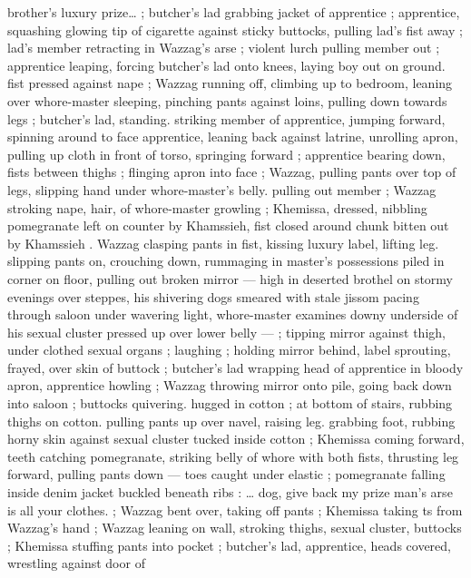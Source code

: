 brother's luxury prize{\ldots}{\gr} ; butcher's lad grabbing jacket of 
apprentice ; apprentice, squashing glowing tip of cigarette against 
sticky buttocks, pulling lad's fist away ; lad's member retracting in 
Wazzag's arse ; violent lurch pulling member out ; apprentice 
leaping, forcing butcher's lad onto knees, laying boy out on ground. 
fist pressed against nape ; Wazzag running off, climbing up to 
bedroom, leaning over whore-master sleeping, pinching pants 
against loins, pulling down towards legs ; butcher's lad, standing. 
striking member of apprentice, jumping forward, spinning around to 
face apprentice, leaning back against latrine, unrolling apron, pulling 
up cloth in front of torso, springing forward ; apprentice bearing 
down, fists between thighs ; flinging apron into face ; Wazzag, pulling 
pants over top of legs, slipping hand under whore-master's belly. 
pulling out member ; Wazzag stroking nape, hair, of whore-master 
growling ; Khemissa, dressed, nibbling pomegranate left on counter 
by Khamssieh, fist closed around chunk bitten out by Khamssieh . 
Wazzag clasping pants in fist, kissing luxury label, lifting leg. slipping 
pants on, crouching down, rummaging in master's possessions piled 
in corner on floor, pulling out broken mirror --- high in deserted 
brothel on stormy evenings over steppes, his shivering dogs 
smeared with stale jissom pacing through saloon under wavering 
light, whore-master examines downy underside of his sexual cluster 
pressed up over lower belly --- ; tipping mirror against thigh, under 
clothed sexual organs ; laughing ; holding mirror behind, label 
sprouting, frayed, over skin of buttock ; butcher's lad wrapping head 
of apprentice in bloody apron, apprentice howling ; Wazzag throwing 
mirror onto pile, going back down into saloon ; buttocks quivering. 
hugged in cotton ; at bottom of stairs, rubbing thighs on cotton. 
pulling pants up over navel, raising leg. grabbing foot, rubbing horny 
skin against sexual cluster tucked inside cotton ; Khemissa coming 
forward, teeth catching pomegranate, striking belly of whore with 
both fists, thrusting leg forward, pulling pants down --- toes caught 
under elastic ; pomegranate falling inside denim jacket buckled 
beneath ribs : {\gl}{\ldots} dog, give back my prize{\td} man's arse is all your 
clothes.{\gr} ; Wazzag bent over, taking off pants ; Khemissa taking 
ts from Wazzag's hand ; Wazzag leaning on wall, stroking thighs, 
sexual cluster, buttocks ; Khemissa stuffing pants into pocket ; 
butcher's lad, apprentice, heads covered, wrestling against door of 
